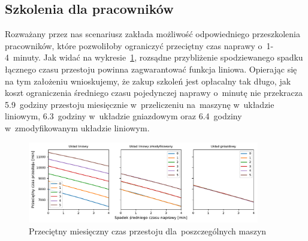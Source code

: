 \documentclass[12pt, a4paper, oneside]{mwart} %
\begin{document}
\subsection{Szkolenia dla pracowników}
Rozważany przez nas scenariusz zakłada możliwość odpowiedniego przeszkolenia pracowników, które pozwoliłoby ograniczyć przeciętny czas naprawy o~1-4~minuty. Jak widać na wykresie~\ref{wyk_szkolenia}, rozsądne przybliżenie spodziewanego spadku łącznego czasu przestoju powinna zagwarantować funkcja liniowa. Opierając się na tym założeniu wnioskujemy, że zakup szkoleń jest opłacalny tak długo, jak koszt ograniczenia średniego czasu pojedynczej naprawy o~minutę nie przekracza 5.9~godziny przestoju miesięcznie w~przeliczeniu na~maszynę w~układzie liniowym, 6.3~godziny w~układzie gniazdowym oraz 6.4~godziny w~zmodyfikowanym układzie liniowym.
\begin{figure}
\centering
\caption{Przeciętny miesięczny czas przestoju dla~poszczególnych maszyn}
\label{wyk_szkolenia}
\includegraphics[width = 0.9\textwidth]{wykresy/szkolenia.pdf}
\end{figure}
\end{document}
